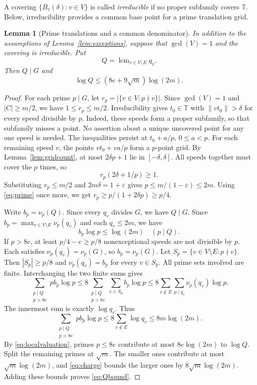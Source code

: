 \documentclass[12pt,leqno]{article}
\numberwithin{equation}{section}
\newtheorem{lemma}[theorem]{Lemma}
\theoremstyle{remark}
\newcommand{\LRtorus}{\mathbb T}
\DeclareMathOperator{\LRlcm}{lcm}
\begin{document}
A covering $\{B_v(\delta):v\in V\}$ is called \emph{irreducible} if no proper subfamily covers $\LRtorus$. Below, irreducibility provides a common base point for a prime translation grid.

\begin{lemma}[Prime translations and a common denominator]\label{lem:denominator}
In addition to the assumptions of Lemma~\ref{lem:exceptions}, suppose that $\gcd(V)=1$ and the covering is irreducible. Put
\[
Q=\LRlcm_{v\in V\setminus E}q_v.
\]
Then $Q\mid G$ and
\begin{equation}\label{eq:Qbound}
\log Q\le(8e+9\sqrt m)\log(2m).
\end{equation}
\end{lemma}
\begin{proof}
For each prime $p\mid G$, let $r_p=|\{v\in V:p\nmid v\}|$. Since $\gcd(V)=1$ and $|C|\ge m/2$, we have $1\le r_p\le m/2$. Irreducibility gives $t_0\in\LRtorus$ with $\|vt_0\|>\delta$ for every speed divisible by $p$. Indeed, these speeds form a proper subfamily, so that subfamily misses a point. No assertion about a unique uncovered point for any one speed is needed. The inequalities persist at $t_0+a/p$, $0\le a<p$. For each remaining speed $v$, the points $vt_0+va/p$ form a $p$-point grid. By Lemma~\ref{lem:gridcount}, at most $2\delta p+1$ lie in $[-\delta,\delta]$. All speeds together must cover the $p$ times, so
\begin{equation}\label{eq:prime}
r_p(2\delta+1/p)\ge1.
\end{equation}
Substituting $r_p\le m/2$ and $2m\delta=1+\varepsilon$ gives
$p\le m/(1-\varepsilon)\le2m$. Using \eqref{eq:prime} once more, we get
$r_p\ge p/(1+2\delta p)\ge p/4$.

Write $b_p=\nu_p(Q)$. Since every $q_v$ divides $G$, we have $Q\mid G$. Since $b_p=\max_{v\in V\setminus E}\nu_p(q_v)$ and each $q_v\le2m$, we have
\begin{equation}\label{eq:localvaluation}
b_p\log p\le\log(2m)\quad(p\mid Q).
\end{equation}
If $p>8e$, at least $p/4-e\ge p/8$ nonexceptional speeds are not divisible by $p$. Each satisfies $\nu_p(q_v)=\nu_p(G)$, so $b_p=\nu_p(G)$. Let $S_p=\{v\in V\setminus E:p\nmid v\}$. Then $|S_p|\ge p/8$ and $\nu_p(q_v)=b_p$ for every $v\in S_p$. All prime sets involved are finite. Interchanging the two finite sums gives
\[
\sum_{\substack{p\mid Q\\p>8e}}p b_p\log p
\le8\sum_{\substack{p\mid Q\\p>8e}}\sum_{v\in S_p}b_p\log p
\le8\sum_{v\notin E}\sum_{p\mid q_v}\nu_p(q_v)\log p.
\]
The innermost sum is exactly $\log q_v$. Thus
\begin{equation}\label{eq:charge}
\sum_{\substack{p\mid Q\\p>8e}}p b_p\log p
\le8\sum_{v\notin E}\log q_v\le8m\log(2m).
\end{equation}
By \eqref{eq:localvaluation}, primes $p\le8e$ contribute at most $8e\log(2m)$ to $\log Q$. Split the remaining primes at $\sqrt m$. The smaller ones contribute at most $\sqrt m\log(2m)$, and \eqref{eq:charge} bounds the larger ones by $8\sqrt m\log(2m)$. Adding these bounds proves \eqref{eq:Qbound}.
\end{proof}
\end{document}
